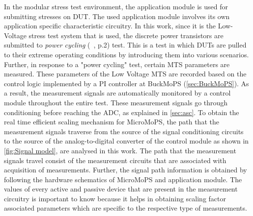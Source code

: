 In the modular stress test environment, the application module is used for submitting stresses on DUT. 
The used application module involves its own application specific characteristic circuitry.
In this work, since it is the Low-Voltage stress test system that is used, the discrete power transistors are submitted to \emph{power cycling} (~\cite{Sleik2016}, p.2) test. 
This is a test in which \acrshort{DUT}s are pulled to their extreme operating conditions by introducing them into various scenarios. %
Further, in response to a "power cycling" test, certain \acrshort{MTS} parameters are measured. %
These parameters of the Low Voltage MTS are recorded based on the control logic implemented by a PI controller at BuckMoPS (\cref{sec:BuckMoPS}). 
As a result, the measurement signals are automatically monitored by a control module throughout the entire test. 
These measurement signals go through conditioning before reaching the ADC, as explained in \cref{sec:asc}. 
To obtain the real time efficient scaling mechanism for MicroMoPS, the path that the measurement signals traverse from the source of the signal conditioning circuits to the source of the analog-to-digital converter of the control module as shown in \cref{fig:Signal model}, are analysed in this work. 
The path that the measurement signals travel consist of the measurement circuits that are associated with acquisition of measurements. 
Further, the signal path information is obtained by following the hardware schematics of MicroMoPS and application module. 
The values of every active and passive device that are present in the measurement circuitry is important to know because it helps in obtaining scaling factor associated parameters which are specific to the respective type of measurements.
